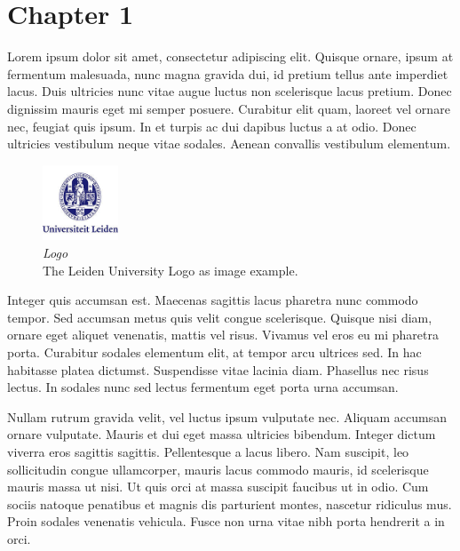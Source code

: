 
\chapter{Chapter 1}\label{ch:1}
Lorem ipsum dolor sit amet, consectetur adipiscing elit. Quisque ornare, ipsum at fermentum malesuada, nunc magna gravida dui, id pretium tellus ante imperdiet lacus. Duis ultricies nunc vitae augue luctus non scelerisque lacus pretium. Donec dignissim mauris eget mi semper posuere. Curabitur elit quam, laoreet vel ornare nec, feugiat quis ipsum. In et turpis ac dui dapibus luctus a at odio. Donec ultricies vestibulum neque vitae sodales. Aenean convallis vestibulum elementum\autocite{Breuker:2010fk}.
\begin{figure}[h]
  \begin{minipage}{\textwidth}
    \centering
    \includegraphics[width=0.2\textwidth]{./Images/200px-Seal_Leiden_University.jpg}
    \caption[Logo]{\textit{Logo}\\The Leiden University Logo as image example.\cite{University:fk}}
    \label{fig:Photo7}
  \end{minipage}
\end{figure}
Integer quis accumsan est. Maecenas sagittis lacus pharetra nunc commodo tempor. Sed accumsan metus quis velit congue scelerisque. Quisque nisi diam, ornare eget aliquet venenatis, mattis vel risus. Vivamus vel eros eu mi pharetra porta. Curabitur sodales elementum elit, at tempor arcu ultrices sed. In hac habitasse platea dictumst. Suspendisse vitae lacinia diam. Phasellus nec risus lectus. In sodales nunc sed lectus fermentum eget porta urna accumsan.

Nullam rutrum gravida velit, vel luctus ipsum vulputate nec. Aliquam accumsan ornare vulputate. Mauris et dui eget massa ultricies bibendum. Integer dictum viverra eros sagittis sagittis. Pellentesque a lacus libero. Nam suscipit, leo sollicitudin congue ullamcorper, mauris lacus commodo mauris, id scelerisque mauris massa ut nisi. Ut quis orci at massa suscipit faucibus ut in odio. Cum sociis natoque penatibus et magnis dis parturient montes, nascetur ridiculus mus. Proin sodales venenatis vehicula. Fusce non urna vitae nibh porta hendrerit a in orci.

